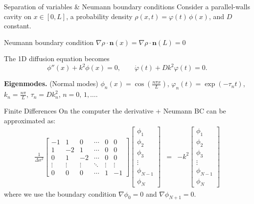 \documentclass[aspectratio=169]{beamer}
\begin{document}
\begin{frame}{Separation of variables \& Neumann boundary conditions}
    Consider a parallel-walls cavity on $x\!\in\![0,L]$, a probability density 
    $\rho(x,t)=\varphi(t)\,\phi(x)$, and $D$ constant. 

    \pause
    Neumann boundary condition $\nabla \rho \cdot \bm{n} (x) = \nabla \rho \cdot \bm{n} (L) = 0$

    \pause
    The 1D diffusion equation becomes 
    \[
    \phi''(x) + k^2 \phi(x) = 0, \qquad
    \dot{\varphi}(t) + D k^2 \varphi(t) = 0.
    \]

    \pause
    \textbf{Eigenmodes.} (Normal modes)
    $\phi_n(x)=\cos\!\left(\tfrac{n\pi x}{L}\right)$,\;
    $\varphi_n(t) = \exp(- \tau_n t)$, \;
    $k_n=\tfrac{n\pi}{L}$,\;
    $\tau_n=Dk_n^2$,\;
    $n=0,\,1,\hdots$.
\end{frame}

\begin{frame}{Finite Differences}
    On the computer the derivative + Neumann BC can be approximated as:
    \begin{eqnarray}
        \frac{1}{\Delta x^2}\begin{bmatrix}
            -1 & 1 & 0 & \cdots & 0 & 0\\
            1 & -2 & 1 & \cdots & 0 & 0\\  
            0 & 1 & -2 & \cdots & 0 & 0\\      
            \vdots & \vdots & \vdots & \ddots & \vdots & \vdots \\
            0 & 0 & 0 & \cdots & 1 & -1
        \end{bmatrix}
        \begin{bmatrix}
            \phi_1 \\  \phi_2 \\  \phi_3 \\ \vdots \\ \phi_{N-1} \\  \phi_N 
        \end{bmatrix} 
        & = &
        -k^2 
        \begin{bmatrix}
            \phi_1 \\  \phi_2 \\  \phi_3 \\ \vdots \\ \phi_{N-1} \\  \phi_N 
        \end{bmatrix} 
    \end{eqnarray}
    where we use the boundary condition $\nabla \phi_0=0$ and $\nabla \phi_{N+1}=0$.
\end{frame}
\end{document}
